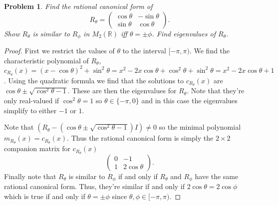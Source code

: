 \documentclass{article}
\newtheorem{problem}{Problem}
\begin{document}

\begin{problem}
Find the rational canonical form of
\[
R_{\theta} =
\left (
\begin{array}{cc}
\cos \theta & -\sin \theta\\
\sin \theta & \cos \theta
\end{array}
\right ).
\]
Show $R_{\theta}$ is similar to $R_{\phi}$ in $M_2(\mathbb{R})$ iff $\theta = \pm \phi$. Find eigenvalues of $R_{\theta}$.
\end{problem}
\begin{proof}
First we restrict the values of $\theta$ to the interval $[-\pi,\pi)$. We find the characteristic polynomial of $R_{\theta}$, $c_{R_{\theta}}(x) = (x-\cos \theta)^2 + \sin^2 \theta = x^2 - 2x\cos \theta + \cos^2 \theta + \sin^2 \theta = x^2 - 2x\cos \theta + 1$. Using the quadratic formula we find that the solutions to $c_{R_{\theta}}(x)$ are $\cos \theta \pm \sqrt{\cos^2 \theta - 1}$. These are then the eigenvalues for $R_{\theta}$. Note that they're only real-valued if $\cos^2 \theta = 1$ so $\theta \in \{-\pi,0\}$ and in this case the eigenvalues simplify to either $-1$ or $1$.

Note that $(R_{\theta} - (\cos \theta \pm \sqrt{\cos^2 \theta - 1})I) \neq 0$ so the minimal polynomial $m_{R_{\theta}}(x) = c_{R_{\theta}}(x)$. Thus the rational canonical form is simply the $2 \times 2$ companion matrix for $c_{R_{\theta}}(x)$
\[
\left (
\begin{array}{cc}
0 & -1\\
1 & 2\cos \theta
\end{array}
\right).
\]
Finally note that $R_{\theta}$ is similar to $R_{\phi}$ if and only if $R_{\theta}$ and $R_{\phi}$ have the same rational canonical form. Thus, they're similar if and only if $2\cos \theta = 2 \cos \phi$ which is true if and only if $\theta = \pm \phi$ since $\theta,\phi \in [-\pi,\pi)$.
\end{proof}
\end{document}
